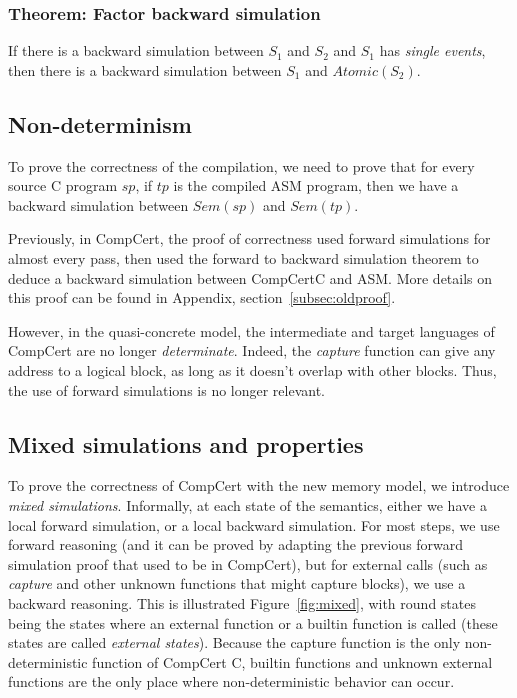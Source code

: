 \subsubsection{Theorem: Factor backward simulation} If there is a backward simulation between $S_1$ and $S_2$ and $S_1$ has \textit{single events}, then there is a backward simulation between $S_1$ and $\mathit{Atomic}(S_2)$.

\subsection{Non-determinism}
To prove the correctness of the compilation, we need to prove that for every source C program $sp$, if $tp$ is the compiled ASM program, then we have a backward simulation between $\mathit{Sem}(sp)$ and $\mathit{Sem}(tp)$.

Previously, in CompCert, the proof of correctness used forward simulations for almost every pass, then used the forward to backward simulation theorem to deduce a backward simulation between CompCertC and ASM. More details on this proof can be found in Appendix, section~\ref{subsec:oldproof}.

However, in the quasi-concrete model, the intermediate and target languages of CompCert are no longer \textit{determinate}. Indeed, the \textit{capture} function can give any address to a logical block, as long as it doesn't overlap with other blocks.
Thus, the use of forward simulations is no longer relevant.

\subsection{Mixed simulations and properties}
To prove the correctness of CompCert with the new memory model, we introduce \textit{mixed simulations}. Informally, at each state of the semantics, either we have a local forward simulation, or a local backward simulation. For most steps, we use forward reasoning (and it can be proved by adapting the previous forward simulation proof that used to be in CompCert), but for external calls (such as \textit{capture} and other unknown functions that might capture blocks), we use a backward reasoning. This is illustrated Figure~\ref{fig:mixed}, with round states being the states where an external function or a builtin function is called (these states are called \textit{external states}). Because the capture function is the only non-deterministic function of CompCert C, builtin functions and unknown external functions are the only place where non-deterministic behavior can occur.

